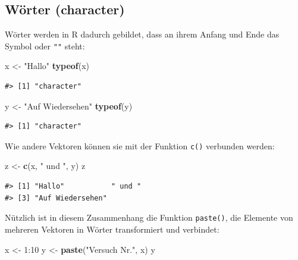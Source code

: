 \documentclass[]{tufte-book}
\newenvironment{Shaded}{}{}
\newcommand{\KeywordTok}[1]{\textcolor[rgb]{0.00,0.44,0.13}{\textbf{#1}}}
\newcommand{\DecValTok}[1]{\textcolor[rgb]{0.25,0.63,0.44}{#1}}
\newcommand{\StringTok}[1]{\textcolor[rgb]{0.25,0.44,0.63}{#1}}
\newcommand{\OperatorTok}[1]{\textcolor[rgb]{0.40,0.40,0.40}{#1}}
\newcommand{\NormalTok}[1]{#1}
\begin{document}
\subsection{Wörter (character)}\label{worter-character}

Wörter werden in R dadurch gebildet, dass an ihrem Anfang und Ende das
Symbol \texttt{\textquotesingle{}} oder \texttt{""} steht:

\begin{Shaded}
\begin{Highlighting}[]
\NormalTok{x <-}\StringTok{ "Hallo"}
\KeywordTok{typeof}\NormalTok{(x)}
\end{Highlighting}
\end{Shaded}

\begin{verbatim}
#> [1] "character"
\end{verbatim}

\begin{Shaded}
\begin{Highlighting}[]
\NormalTok{y <-}\StringTok{ "Auf Wiedersehen"}
\KeywordTok{typeof}\NormalTok{(y)}
\end{Highlighting}
\end{Shaded}

\begin{verbatim}
#> [1] "character"
\end{verbatim}

Wie andere Vektoren können sie mit der Funktion \texttt{c()} verbunden
werden:

\begin{Shaded}
\begin{Highlighting}[]
\NormalTok{z <-}\StringTok{ }\KeywordTok{c}\NormalTok{(x, }\StringTok{" und "}\NormalTok{, y)}
\NormalTok{z}
\end{Highlighting}
\end{Shaded}

\begin{verbatim}
#> [1] "Hallo"           " und "          
#> [3] "Auf Wiedersehen"
\end{verbatim}

Nützlich ist in diesem Zusammenhang die Funktion \texttt{paste()}, die
Elemente von mehreren Vektoren in Wörter transformiert und verbindet:

\begin{Shaded}
\begin{Highlighting}[]
\NormalTok{x <-}\StringTok{ }\DecValTok{1}\OperatorTok{:}\DecValTok{10}
\NormalTok{y <-}\StringTok{ }\KeywordTok{paste}\NormalTok{(}\StringTok{"Versuch Nr."}\NormalTok{, x)}
\NormalTok{y}
\end{Highlighting}
\end{Shaded}
\end{document}
